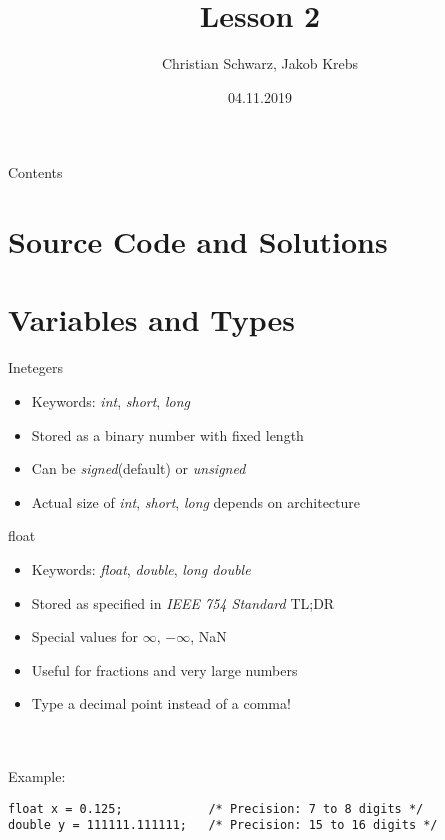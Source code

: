 \documentclass[10pt,graphics,aspectratio=169,table]{beamer}
\title{Lesson 2}
\author{Christian Schwarz, Jakob Krebs}
\date{04.11.2019}
\begin{document}
\maketitle

\begin{frame}{Contents}
	\tableofcontents
\end{frame}

\section{Source Code and Solutions}

\section{Variables and Types}
\begin{frame}{Inetegers}
	\begin{itemize}
		\item Keywords: \textit{int}, \textit{short}, \textit{long}
		\item Stored as a binary number with fixed length
		\item Can be \textit{signed}(default) or \textit{unsigned}
		\item Actual size of \textit{int}, \textit{short}, \textit{long} depends on architecture
	\end{itemize}
\end{frame}
\begin{frame}[fragile]{float}
\begin{itemize}
		\item Keywords: \textit{float}, \textit{double}, \textit{long double}
		\item Stored as specified in \textit{IEEE 754 Standard} TL;DR
		\item Special values for $\infty$, $-\infty$, NaN
		\item Useful for fractions and very large numbers
		\item Type a decimal point instead of a comma!
	\end{itemize}\ \\
	\ \\
	Example:
	\begin{lstlisting}[numbers=none]
float x = 0.125;			/* Precision: 7 to 8 digits */
double y = 111111.111111;	/* Precision: 15 to 16 digits */
\end{lstlisting}
\end{frame}
\end{document}
